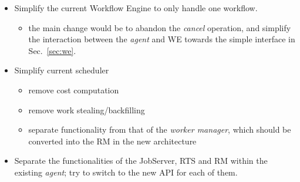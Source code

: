 \documentclass[10pt]{article}
\newcommand{\rts}{RTS\xspace}
\newcommand{\rman}{RM\xspace}
\newcommand{\we}{WE\xspace}
\begin{document}
\begin{itemize}
    \item Simplify the current Workflow Engine to only handle one workflow.
    \begin{itemize}
        \item the main change would be to abandon the \emph{cancel} operation,
        and simplify the interaction between the \emph{agent} and \we towards the simple
        interface in Sec.~\ref{sec:we}.
    \end{itemize}
    \item Simplify current scheduler
    \begin{itemize}
        \item remove cost computation
        \item remove work stealing/backfilling 
        \item separate functionality from that of the \emph{worker manager},
        which should be converted into the \rman in the new architecture
    \end{itemize}     
    
    \item Separate the functionalities of the JobServer, \rts and \rman within
    the existing \emph{agent}; try to switch to the new API for each of them.
\end{itemize}
\end{document}
